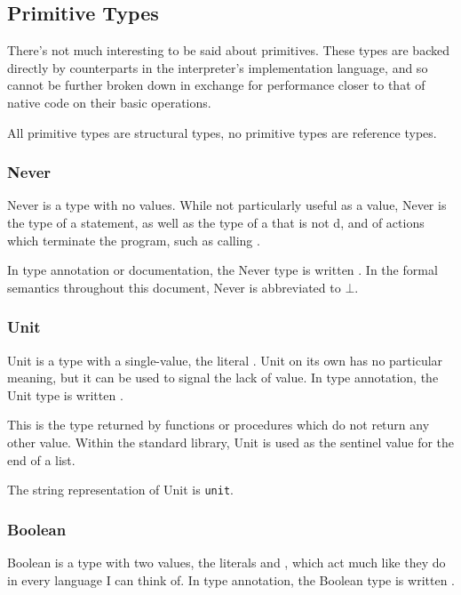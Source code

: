 \subsection{Primitive Types}

There's not much interesting to be said about primitives. These types are
backed directly by counterparts in the interpreter's implementation language,
and so cannot be further broken down in exchange for performance closer to
that of native code on their basic operations.

All primitive types are structural types, no primitive types are reference
types.

\subsubsection{Never}

Never is a type with no values. While not particularly useful as a value,
Never is the type of a  statement, as well as the type of
a  that is not d, and of actions which terminate the
program, such as calling .

In type annotation or documentation, the Never type is written \ty{!}.
In the formal semantics throughout this document, Never is abbreviated to
$\bot$.

\subsubsection{Unit}

Unit is a type with a single-value, the literal . Unit on its own
has no particular meaning, but it can be used to signal the lack of value.
In type annotation, the Unit type is written .

This is the type returned by functions or procedures which do not return
any other value. Within the standard library, Unit is used as the sentinel
value for the end of a list.

The string representation of Unit is \texttt{unit}.

\subsubsection{Boolean}

Boolean is a type with two values, the literals  and ,
which act much like they do in every language I can think of.
In type annotation, the Boolean type is written .

